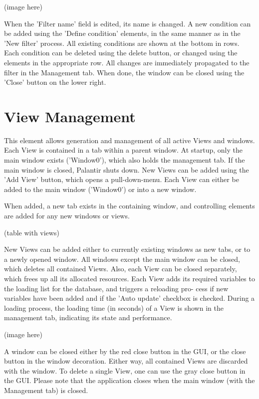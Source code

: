 \documentclass[10pt,letterpaper,extrafontsizes]{memoir}
\begin{document}
(image here)

When the 'Filter name' field is edited, its name is changed.  A new condition can be added using the
'Define condition' elements, in the same manner as in the 'New filter' process. All existing conditions are
shown at the bottom in rows.  Each condition can be deleted using the delete button, or changed using the elements in the appropriate row.
All changes are immediately propagated to the filter in the Management tab.  When done, the window
can be closed using the 'Close' button on the lower right.

\section{View Management}
\label{sec:view_management}

This element allows generation and management of all active Views and windows. Each View is contained
in a tab within a parent window.  At startup, only the main window exists ('Window0'), which also holds
the management tab. If the main window is closed, Palantir shuts down.
New Views can be added using the 'Add View' button, which opens a pull-down-menu. Each View can
either be added to the main window ('Window0') or into a new window.

When added, a new tab exists in the containing window, and controlling elements are added for any new
windows or views.

(table with views)

New Views can be added either to currently existing windows as new tabs, or to a newly opened window.
All windows except the main window can be closed, which deletes all contained Views.  Also, each View
can be closed separately, which frees up all its allocated resources.
Each View adds its required variables to the loading list for the database, and triggers a reloading pro-
cess if new variables have been added and if the 'Auto update' checkbox is checked.  During a loading
process, the loading time (in seconds) of a View is shown in the management tab, indicating its state and
performance.

(image here)

A window can be closed either by the red close button in the GUI, or the close button in the window
decoration.  Either way, all contained Views are discarded with the window.  To delete a single View, one
can use the gray close button in the GUI.
Please note that the application closes when the main window (with the Management tab) is closed.
\end{document}
